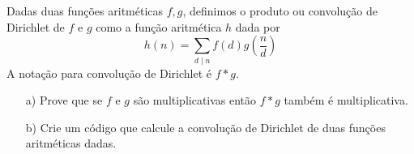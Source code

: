 \begin{exercise}
  Dadas duas funções aritméticas $f,g$, definimos o produto ou
  convolução de Dirichlet de $f$ e $g$ como a função aritmética $h$
  dada por 
  $$
    h(n) = \sum_{d \mid n} f(d) g\left(\frac{n}{d}\right)
  $$
  A notação para convolução de Dirichlet é $f*g$.
  \begin{itemize}
    \item[a)] Prove que se $f$ e $g$ são multiplicativas
    então $f*g$ também é multiplicativa.
    \item[b)] Crie um código que calcule a convolução de Dirichlet
    de duas funções aritméticas dadas.
  \end{itemize}
\end{exercise}